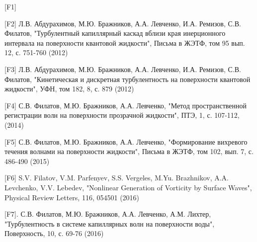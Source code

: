 \clearpage                                  %



[F1]

[F2] Л.В. Абдурахимов, М.Ю. Бражников, А.А. Левченко, И.А. Ремизов, С.В. Филатов, "Турбулентный капиллярный каскад вблизи края инерционного интервала на поверхности квантовой жидкости", Письма в ЖЭТФ, том 95 вып. 12, с. 751-760 (2012)

[F3] Л.В. Абдурахимов, М.Ю. Бражников, А.А. Левченко, И.А. Ремизов, С.В. Филатов, "Кинетическая и дискретная турбулентность на поверхности квантовой жидкости", УФН, том 182, 8, с. 879 (2012)

[F4] С.В. Филатов, М.Ю. Бражников, А.А. Левченко, "Метод пространственной регистрации волн на поверхности прозрачной жидкости", ПТЭ, 1, с. 107-112, (2014)

[F5] С.В. Филатов, М.Ю. Бражников, А.А. Левченко, "Формирование вихревого течения волнами на поверхности жидкости", Письма в ЖЭТФ, том 102, вып. 7, с. 486-490 (2015)

[F6] S.V. Filatov, V.M. Parfenyev, S.S. Vergeles, M.Yu. Brazhnikov, A.A. Levchenko, V.V. Lebedev, "Nonlinear Generation of Vorticity by Surface Waves", Physical Review Letters, 116, 054501 (2016)

[F7]. С.В. Филатов, М.Ю. Бражников, А.А. Левченко,  А.М. Лихтер, "Турбулентность в системе капиллярных волн на поверхности воды", Поверхность, 10, с. 69-76 (2016)

